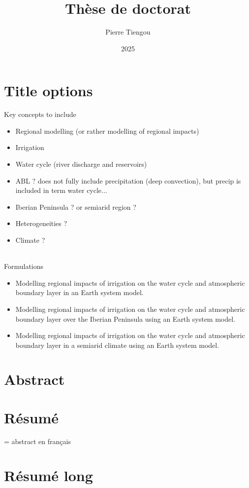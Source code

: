 \documentclass{report}
\begin{document}
\section*{Title options}
    Key concepts to include
    \begin{itemize}
        \item Regional modelling (or rather modelling of regional impacts)
        \item Irrigation
        \item Water cycle (river discharge and reservoirs)
        \item ABL ? does not fully include precipitation (deep convection), but precip is included in term water cycle...
        \item Iberian Peninsula ? or semiarid region ? 
        \item Heterogeneities ?
        \item Climate ?
    \end{itemize}
    \hfill
    \\
    Formulations
    \begin{itemize}
        \item Modelling regional impacts of irrigation on the water cycle and atmospheric boundary layer in an Earth system model.
        \item Modelling regional impacts of irrigation on the water cycle and atmospheric boundary layer over the Iberian Peninsula using an Earth system model.
        \item Modelling regional impacts of irrigation on the water cycle and atmospheric boundary layer in a semiarid climate using an Earth system model.
    \end{itemize}


\title{Thèse de doctorat}
\author{Pierre Tiengou }
\date{2025}
\maketitle

\section*{Abstract}
\section*{Résumé}
= abstract en français
\section*{Résumé long}
\end{document}
